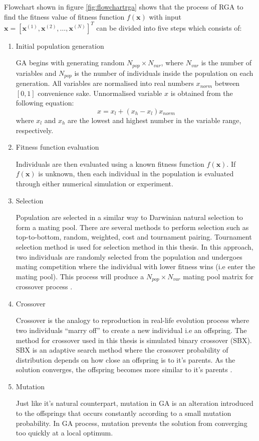 Flowchart shown in figure \ref{fig:flowchartrga} shows that the process of RGA to find the fitness value of fitness function $f(\mathbf{x})$ with input $\mathbf{x} = [\mathbf{x}^{(1)}, \mathbf{x}^{(2)}, \ldots, \mathbf{x}^{(N)}]^{T}$ can be divided into five steps which consists of:
\begin{enumerate}
    \item Initial population generation

    GA begins with generating random $N_{pop} \times N_{var}$, where $N_{var}$ is the number of variables and $N_{pop}$ is the number of individuals inside the population on each generation. All variables are normalised into real numbers $x_{norm}$ between $[0, 1]$ convenience sake. Unnormalised variable $x$ is obtained from the following equation:
    \begin{equation}
        x = x_{l} + \left(x_{h} - x_{l}\right)x_{norm}
        \label{eq:norm2unnorm}
    \end{equation}
    where $x_{l}$ and $x_{h}$ are the lowest and highest number in the variable range, respectively.
    \item Fitness function evaluation

    Individuals are then evaluated using a known fitness function $f(\mathbf{x})$. If $f(\mathbf{x})$ is unknown, then each individual in the population is evaluated through either numerical simulation or experiment.
    \item Selection

    Population are selected in a similar way to Darwinian natural selection to form a mating pool. There are several methods to perform selection such as top-to-bottom, random, weighted, cost and tournament pairing. Tournament selection method is used for selection method in this thesis. In this approach, two individuals are randomly selected from the population and undergoes mating competition where the individual with lower fitness wins (i.e enter the mating pool). This process will produce a $N_{pop} \times N_{var}$ mating pool matrix for crossover process \citep{haupt}.
    \item Crossover

    Crossover is the analogy to reproduction in real-life evolution process where two individuals ``marry off'' to create a new individual i.e an offspring. The method for crossover used in this thesis is simulated binary crossover (SBX). SBX is an adaptive search method where the crossover probability of distribution depends on how close an offspring is to it's parents. As the solution converges, the offspring becomes more similar to it's parents \citep{deb}.
    \item Mutation

    Just like it's natural counterpart, mutation in GA is an alteration introduced to the offsprings that occurs constantly according to a small mutation probability. In GA process, mutation prevents the solution from converging too quickly at a local optimum.
\end{enumerate}
